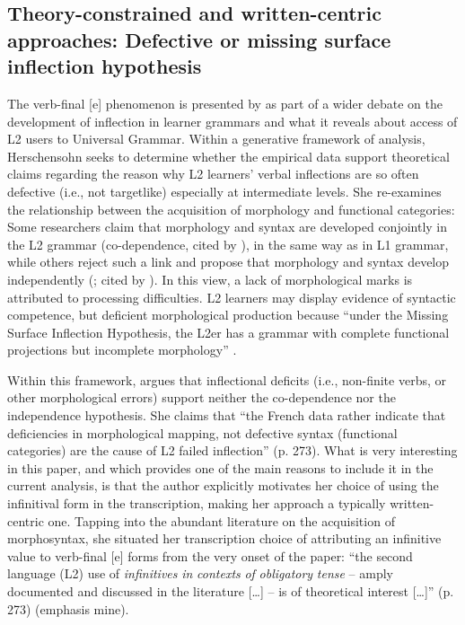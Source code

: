 \documentclass[output=paper,colorlinks,citecolor=brown,modfonts,nonflat]{../langscibook}
\begin{document}
\subsection{ \textbf{Theory-constrained and written-centric approaches: Defective or missing surface inflection hypothesis}}%

The verb-final [e] phenomenon is presented by \citet{Herschensohn2001} as part of a wider debate on the development of inflection in learner grammars and what it reveals about access of L2 users to Universal Grammar. Within a generative framework of analysis, Herschensohn seeks to determine whether the empirical data support theoretical claims regarding the reason why L2 learners’ verbal inflections are so often defective (i.e., not targetlike) especially at intermediate levels. She re-examines the relationship between the acquisition of morphology and functional categories: Some researchers claim that morphology and syntax are developed conjointly in the L2 grammar (co-dependence, \citealt{Eubank1993, VainikkaYoung-Scholten1996, VainikkaYoung-Scholten1998Triggers, VainikkaYoung-Scholten1998Acquisition} cited by \citealt{Herschensohn2001}), in the same way as in L1 grammar, while others reject such a link and propose that morphology and syntax develop independently (\citealt{SchwartzSprouse1996}; \citealt{Lardière1998} cited by \citealt{Herschensohn2001}). In this view, a lack of morphological marks is attributed to processing difficulties. L2 learners may display evidence of syntactic competence, but deficient morphological production because “under the Missing Surface Inflection Hypothesis, the L2er has a grammar with complete functional projections but incomplete morphology” \citep[280]{Herschensohn2001}.

Within this framework, \citet{Herschensohn2001} argues that inflectional deficits (i.e., non-finite verbs, or other morphological errors) support neither the co-depen\-dence nor the independence hypothesis. She claims that “the French data rather indicate that deficiencies in morphological mapping, not defective syntax (functional categories) are the cause of L2 failed inflection” (p. 273). What is very interesting in this paper, and which provides one of the main reasons to include it in the current analysis, is that the author explicitly motivates her choice of using the infinitival form in the transcription, making her approach a typically written-centric one. Tapping into the abundant literature on the acquisition of morphosyntax, she situated her transcription choice of attributing an infinitive value to verb-final [e] forms from the very onset of the paper: “the second language (L2) use of \textit{infinitives} \textit{in} \textit{contexts} \textit{of} \textit{obligatory} \textit{tense} – amply documented and discussed in the literature […] – is of theoretical interest […]” (p. 273) (emphasis mine).
\end{document}
